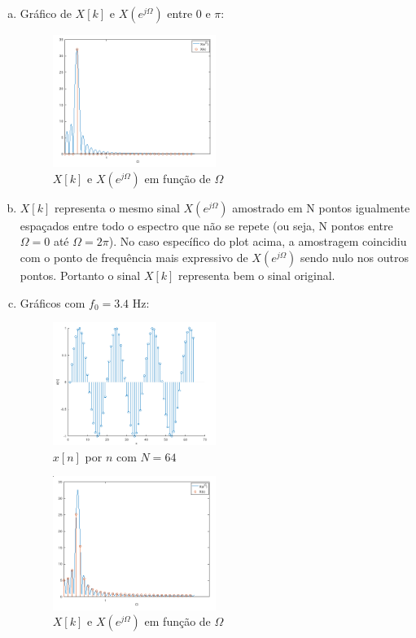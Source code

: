 \documentclass{article}
\begin{document}
\begin{enumerate}[(a)]
\item

    Gráfico de $X[k]$ e $X(e^{j\Omega})$ entre $0$ e $\pi$:

\begin{figure}[H]
\centering
\includegraphics[width=0.5\textwidth]{images/xk_xejomega.png}
    \caption{$X[k]$ e $X(e^{j\Omega})$ em função de $\Omega$}
\end{figure}

\item

    $X[k]$ representa o mesmo sinal $X(e^{j\Omega})$ amostrado em N pontos igualmente espaçados entre todo o espectro que não se repete (ou seja, N pontos entre $\Omega = 0$ até $\Omega = 2\pi$). No caso específico do plot acima, a amostragem coincidiu com o ponto de frequência mais expressivo de $X(e^{j\Omega})$ sendo nulo nos outros pontos. Portanto o sinal $X[k]$ representa bem o sinal original.

\item

Gráficos com $f_0 = 3.4$ Hz:

\begin{figure}[H]
\centering
\includegraphics[width=0.5\textwidth]{images/xn_3-4.png}
    \caption{$x[n]$ por $n$ com $N = 64$}
\end{figure}

\begin{figure}[H]
\centering
\includegraphics[width=0.5\textwidth]{images/xk_xejomega_3-4.png}
    \caption{$X[k]$ e $X(e^{j\Omega})$ em função de $\Omega$}
\end{figure}


\end{enumerate}
\end{document}
